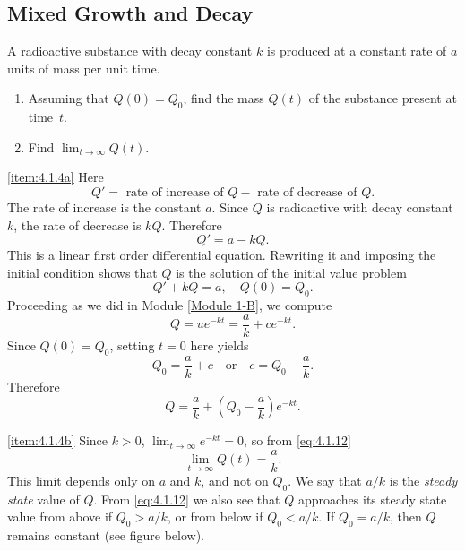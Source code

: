 \documentclass{ximera}
\begin{document}
\subsection*{Mixed Growth and Decay}

\begin{example}\label{example:4.1.4}
A radioactive substance with decay constant $k$ is produced at a
constant rate of $a$ units of mass per unit time.
\begin{enumerate}
\item \label{item:4.1.4a}%
Assuming that $Q(0)=Q_0$, find the mass $Q(t)$ of the
substance present at time~$t$.

\item \label{item:4.1.4b}%
Find $\lim_{t\rightarrow\infty} Q(t)$.
\end{enumerate}
\begin{explanation}
\ref{item:4.1.4a}  Here
$$
Q'=\mbox{ rate of increase of } Q - \mbox{ rate of decrease
of } Q.
$$
The rate of increase is the constant $a$. Since $Q$ is radioactive
with decay constant $k$, the rate of decrease is $kQ$. Therefore
$$
Q'=a-kQ.
$$
This is a linear first order differential equation. Rewriting it and
imposing the initial condition shows that $Q$ is the solution of the
initial value problem
\begin{equation}  \label{eq:4.1.11}
Q'+kQ=a, \quad Q(0)=Q_0.
\end{equation}
Proceeding as we did in Module \ref{Module 1-B}, we compute $$Q=ue^{-kt}=\frac{a}{k}+ce^{-kt}.$$
 Since $Q(0)=Q_0$, setting $t=0$ here yields
$$Q_0=\frac{a}{k}+c  \quad\mbox{or}\quad c=Q_0-\frac{a}{k}.$$
 Therefore
\begin{equation} \label{eq:4.1.12}
Q=\frac{a}{k}+\left(Q_0-\frac{a}{k}\right)e^{-kt}.
\end{equation}

\ref{item:4.1.4b}
Since $k > 0$,  $\lim_{t\rightarrow\infty} e^{-kt}=0$, so
from \eqref{eq:4.1.12}
$$
\lim_{t\rightarrow\infty} Q(t)=\frac{a}{k}.
$$
This limit depends only on $a$ and $k$, and not on $Q_0$.
We say that $a/k$ is the \textit{steady state} value of $Q$. From
\eqref{eq:4.1.12} we also see that $Q$ approaches its steady state value
from above if $Q_0 > a/k$, or from below if $Q_0 < a/k$. If $Q_0=a/k$,
then $Q$ remains constant (see figure below).


\end{explanation}
\end{example}
\end{document}

